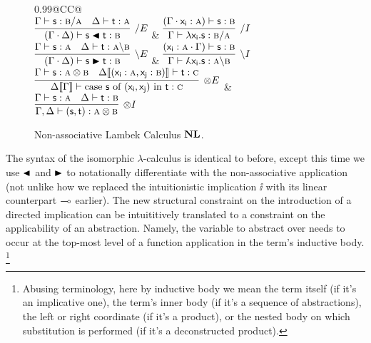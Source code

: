 \begin{figure}
	\centering
	\begin{tabularx}{0.99\textwidth}{@{}CC@{}}
		\\[2em]
		$\infer[\divright E]{(\Gamma \sbind \Delta) \vdash \term{s}\nappright\term{t}: \prop B}{\Gamma \vdash \term{s}: \prop{B} \divright \prop{A} & \Delta \vdash \term{t}: \prop{A}}$
		& 
		$\infer[\divright I]{\Gamma \vdash \term{\lambda x_i .s}: \prop{B} \divright \prop{A}}{(\Gamma \sbind \term{x_i }: \prop A) \vdash \term{s}:\prop B}$\\[2em]
		$\infer[\divleft E]{(\Gamma \sbind \Delta) \vdash \term{s}\nappleft\term{t}:\prop B}{\Gamma \vdash \term{s}: \prop A & \Delta \vdash \term{t}: \prop{A}\divleft\prop{B}}$
		& 
		$\infer[\divleft I]{\Gamma \vdash \term{\adbmal x_i .s}: \prop A \divleft \prop B}{(\term{x_i }: \prop A \sbind \Gamma) \vdash  \term{s}:\prop B}$\\[2em]
		$\infer[\otimes E]{\Delta\ctx{\Gamma} \vdash \cterm{case \term{s} of \term{(x_i , x_j)} in \term{t}}: \prop C}{
			\Gamma \vdash \term{s}: \prop{A}\otimes\prop{B}
			&
			\Delta\ctx{(\term{x_i }: \prop A, \term{x_j}: \prop{B})}  \vdash \term{t}: \prop C}$
		&
		$\infer[\otimes I]{\Gamma,\Delta \vdash \term{(s,t)}: \prop A \otimes \prop B}{\Gamma \vdash \term{s}: \prop A & \Delta \vdash \term{t}: \prop B}$
	\end{tabularx}
	\caption{Non-associative Lambek Calculus $\textbf{NL}$.}
	\label{figure:non_assoc_lambek_rules}
\end{figure}

The syntax of the isomorphic $\lambda$-calculus is identical to before, except this time we use $\blacktriangleleft$ and $\blacktriangleright$ to notationally differentiate with the non-associative application (not unlike how we replaced the intuitionistic implication $\ii$ with its linear counterpart $\li$ earlier).
The new structural constraint on the introduction of a directed implication can be intuititively translated to a constraint on the applicability of an abstraction.
Namely, the variable to abstract over needs to occur at the top-most level of a function application in the term's inductive body.%
\footnote{Abusing terminology, here by inductive body we mean the term itself (if it's an implicative one), the term's inner body (if it's a sequence of abstractions), the left or right coordinate (if it's a product), or the nested body on which substitution is performed (if it's a deconstructed product).}

